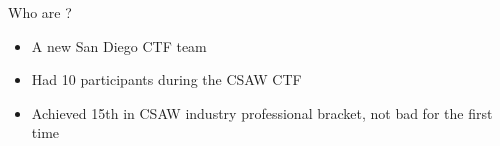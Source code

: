 \begin{frame}{Who are \VaporSec?}
    \begin{itemize}
        \item A new \Aesthetic San Diego CTF team
        \item Had 10 participants during the CSAW CTF
        \item Achieved 15th in CSAW industry professional bracket, not bad for
              the first time
    \end{itemize}
\end{frame}
